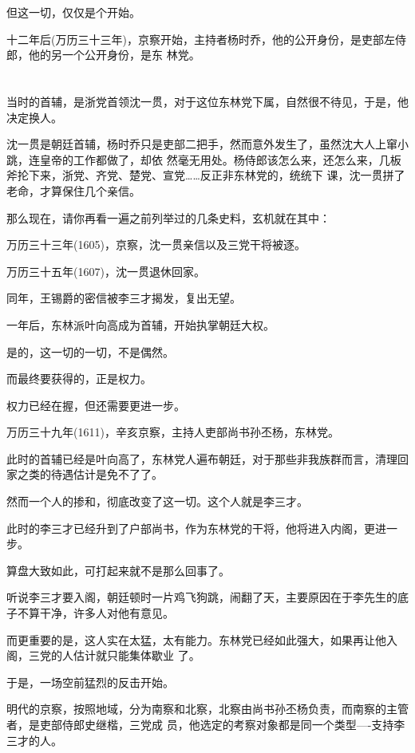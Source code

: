 \documentclass[11pt,a4paper,onecolumn]{article}
\begin{document}
但这一切，仅仅是个开始。

十二年后(万历三十三年)，京察开始，主持者杨时乔，他的公开身份，是吏部左侍郎，他的另一个公开身份，是东
林党。

\section[\thesection]{}

当时的首辅，是浙党首领沈一贯，对于这位东林党下属，自然很不待见，于是，他决定换人。

沈一贯是朝廷首辅，杨时乔只是吏部二把手，然而意外发生了，虽然沈大人上窜小跳，连皇帝的工作都做了，却依
然毫无用处。杨侍郎该怎么来，还怎么来，几板斧抡下来，浙党、齐党、楚党、宣党……反正非东林党的，统统下
课，沈一贯拼了老命，才算保住几个亲信。

那么现在，请你再看一遍之前列举过的几条史料，玄机就在其中：

万历三十三年(1605)，京察，沈一贯亲信以及三党干将被逐。

万历三十五年(1607)，沈一贯退休回家。

同年，王锡爵的密信被李三才揭发，复出无望。

一年后，东林派叶向高成为首辅，开始执掌朝廷大权。

是的，这一切的一切，不是偶然。

而最终要获得的，正是权力。

权力已经在握，但还需要更进一步。

万历三十九年(1611)，辛亥京察，主持人吏部尚书孙丕杨，东林党。

此时的首辅已经是叶向高了，东林党人遍布朝廷，对于那些非我族群而言，清理回家之类的待遇估计是免不了了。

然而一个人的掺和，彻底改变了这一切。这个人就是李三才。

此时的李三才已经升到了户部尚书，作为东林党的干将，他将进入内阁，更进一步。

算盘大致如此，可打起来就不是那么回事了。

听说李三才要入阁，朝廷顿时一片鸡飞狗跳，闹翻了天，主要原因在于李先生的底子不算干净，许多人对他有意见。

而更重要的是，这人实在太猛，太有能力。东林党已经如此强大，如果再让他入阁，三党的人估计就只能集体歇业
了。

于是，一场空前猛烈的反击开始。

明代的京察，按照地域，分为南察和北察，北察由尚书孙丕杨负责，而南察的主管者，是吏部侍郎史继楷，三党成
员，他选定的考察对象都是同一个类型----支持李三才的人。
\end{document}
